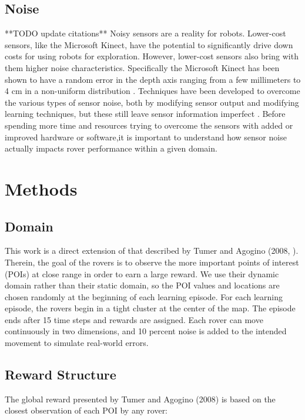 \documentclass[letterpaper, 10 pt, conference]{ieeeconf}  %
\begin{document}
\subsection{Noise}
**TODO update citations**
Noisy sensors are a reality for robots. Lower-cost sensors, like the Microsoft Kinect, have the potential to significantly drive down costs for using robots for exploration. However, lower-cost sensors also bring with them higher noise characteristics. Specifically the Microsoft Kinect has been shown to have a random error in the depth axis ranging from a few millimeters to 4 cm in a non-uniform distribution \cite{khoshelham2012accuracy,nguyen2012modeling}. Techniques have been developed to overcome the various types of sensor noise, both by modifying sensor output and modifying learning techniques, but these still leave sensor information imperfect \cite{nguyen2012modeling,hu2010distributed}. Before spending more time and resources trying to overcome the sensors with added or improved hardware or software,it is important to understand how sensor noise actually impacts rover performance within a given domain.


\section{Methods}
\subsection{Domain}
This work is a direct extension of that described by Tumer and Agogino
(2008, \cite{agogino2008analyzing}). Therein, the goal of the rovers is to observe the more
important points of interest (POIs) at close range in order to earn a
large reward. We use their dynamic domain rather than their static
domain, so the POI values and locations are chosen randomly at the
beginning of each learning episode. For each learning episode, the
rovers begin in a tight cluster at the center of the map. The episode
ends after 15 time steps and rewards are assigned. Each rover can move
continuously in two dimensions, and 10 percent noise is added to the
intended movement to simulate real-world errors.

\subsection{Reward Structure}
The global reward presented by Tumer and Agogino (2008) is based on
the closest observation of each POI by any rover:
  
\end{document}
